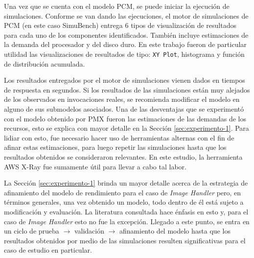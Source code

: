 Una vez que se cuenta con el modelo PCM, se puede iniciar la ejecución de simulaciones. Conforme se van dando las ejecuciones, el motor de simulaciones de PCM (en este caso SimuBench) entrega 6 tipos de visualización de resultados para cada uno de los componentes identificados. También incluye estimaciones de la demanda del procesador y del disco duro. En este trabajo fueron de particular utilidad las visualizaciones de resultados de tipo: \texttt{XY Plot}, histograma y función de distribución acumulada.

Los resultados entregados por el motor de simulaciones vienen dados en tiempos de respuesta en segundos. Si los resultados de las simulaciones están muy alejados de los observados en invocaciones reales, se recomienda modificar el modelo en alguno de sus submodelos asociados. Una de las desventajas que se experimentó con el modelo obtenido por PMX fueron las estimaciones de las demandas de los recursos, esto se explica con mayor detalle en la Sección \ref{sec:experimento-1}. Para lidiar con esto, fue necesario hacer uso de herramientas alternas con el fin de afinar estas estimaciones, para luego repetir las simulaciones hasta que los resultados obtenidos se consideraron relevantes. En este estudio, la herramienta AWS X-Ray fue sumamente útil para llevar a cabo tal labor. 


La Sección \ref{sec:experimento-1} brinda un mayor detalle acerca de la estrategia de afinamiento del modelo de rendimiento para el caso de \emph{Image Handler} pero, en términos generales, una vez obtenido un modelo, todo dentro de él está sujeto a modificación y evaluación. La literatura consultada hace énfasis en esto y, para el caso de \emph{Image Handler} esto no fue la excepción. Llegado a este punto, se entra en un ciclo de prueba $\rightarrow$ validación $\rightarrow$ afinamiento del modelo hasta que los resultados obtenidos por medio de las simulaciones resulten significativas para el caso de estudio en particular.

